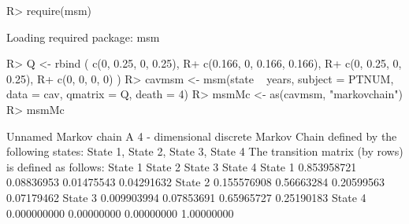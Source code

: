 \documentclass[article,nojss]{jss}
\begin{document}
\begin{CodeChunk}

\begin{CodeInput}
R> require(msm)
\end{CodeInput}

\begin{CodeOutput}
Loading required package: msm
\end{CodeOutput}

\begin{CodeInput}
R> Q <- rbind ( c(0, 0.25, 0, 0.25),
R+              c(0.166, 0, 0.166, 0.166),
R+              c(0, 0.25, 0, 0.25),
R+              c(0, 0, 0, 0) )
R> cavmsm <- msm(state ~ years, subject = PTNUM, data = cav, qmatrix = Q, death = 4)
R> msmMc <- as(cavmsm, "markovchain")
R> msmMc
\end{CodeInput}

\begin{CodeOutput}
Unnamed Markov chain 
 A  4 - dimensional discrete Markov Chain defined by the following states: 
 State 1, State 2, State 3, State 4 
 The transition matrix  (by rows)  is defined as follows: 
            State 1    State 2    State 3    State 4
State 1 0.853958721 0.08836953 0.01475543 0.04291632
State 2 0.155576908 0.56663284 0.20599563 0.07179462
State 3 0.009903994 0.07853691 0.65965727 0.25190183
State 4 0.000000000 0.00000000 0.00000000 1.00000000
\end{CodeOutput}
\end{CodeChunk}
\end{document}
